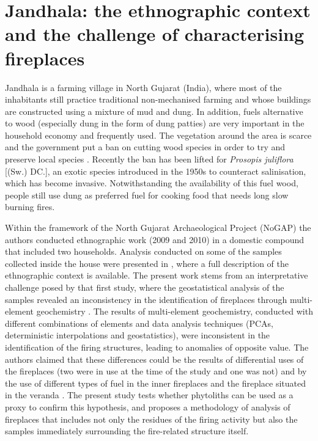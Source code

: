 \documentclass[authoryear,preprint,review,12pt]{elsarticle}
\begin{document}
\section{Jandhala: the ethnographic context and the challenge of characterising fireplaces}
\label{subsec:1.2}
Jandhala is a farming village in North Gujarat (India), where most of the inhabitants still practice traditional non-mechanised farming and whose buildings are constructed using a mixture of mud and dung. In addition, fuels alternative to wood (especially dung in the form of dung patties) are very important in the household economy and frequently used. The vegetation around the area is scarce and the government put a ban on cutting wood species in order to try and preserve local species \citep{Lancelotti2010}. Recently the ban has been lifted for \textit{Prosopis juliflora} [(Sw.) DC.], an exotic species introduced in the 1950s to counteract salinisation, which has become invasive. Notwithstanding the availability of this fuel wood, people still use dung as preferred fuel for cooking food that needs long slow burning fires.\par
Within the framework of the North Gujarat Archaeological Project (NoGAP) \citep{antiquitygallery} the authors conducted ethnographic work (2009 and 2010) in a domestic compound that included two households. Analysis conducted on some of the samples collected inside the house were presented in \citet{Rondelli2014}, where a full description of the ethnographic context is available. The present work stems from an interpretative challenge posed by that first study, where the geostatistical analysis of the samples revealed an inconsistency in the identification of fireplaces through multi-element geochemistry \citep[figures 9 and 10]{Rondelli2014}. The results of multi-element geochemistry, conducted with different combinations of elements and data analysis techniques (PCAs, deterministic interpolations and geostatistics), were inconsistent in the identification of the firing structures, leading to anomalies of opposite value. The authors claimed that these differences could be the results of differential uses of the fireplaces (two were in use at the time of the study and one was not) and by the use of different types of fuel in the inner fireplaces and the fireplace situated in the veranda \citep[figure 3][and figure \ref{fig:samples} in this manuscript]{Rondelli2014}. The present study tests whether phytoliths can be used as a proxy to confirm this hypothesis, and proposes a methodology of analysis of fireplaces that includes not only the residues of the firing activity but also the samples immediately surrounding the fire-related structure itself.
\end{document}
